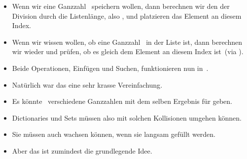 \documentclass[aspectratio=169,mathserif,notheorems]{beamer}%
\begin{document}
\begin{frame}
\begin{itemize}
{}%
%
%
%
\item<18-> Wenn wir eine Ganzzahl~ speichern wollen, dann berechnen wir den  der Division durch die Listenlänge, also , und platzieren das Element an diesem Index.%
%
\item<19-> Wenn wir wissen wollen, ob eine Ganzzahl~ in der Liste ist, dann berechnen wir wieder  und prüfen, ob es gleich dem Element an diesem Index ist~(via ).%
%
\item<20-> Beide Operationen, Einfügen und Suchen, funktionieren nun in~.%
%
\item<21-> Natürlich war das eine sehr krasse Vereinfachung\cite{G2020PHTUTH,L2011PDI}.%
%
\item<22-> Es könnte \DEzB\ verschiedene Ganzzahlen mit dem selben Ergebnis für  geben.%
%
\item<23-> Dictionaries und Sets müssen also mit solchen Kollisionen umgehen können.%
%
\item<24-> Sie müssen auch wachsen können, wenn sie langsam gefüllt werden.%
%
\item<25-> Aber das ist zumindest die grundlegende Idee.%
%
\end{itemize}%
\end{frame}%
%
\end{document}
